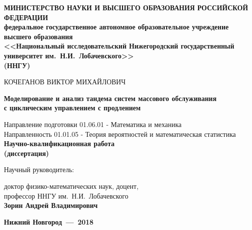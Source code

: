 \documentclass[10pt]{extarticle}
\begin{document}
\begin{titlepage}

  \begin{center}
    \textbf{МИНИСТЕРСТВО НАУКИ И ВЫСШЕГО ОБРАЗОВАНИЯ РОССИЙСКОЙ ФЕДЕРАЦИИ\\
    федеральное государственное автономное образовательное учреждение
    высшего образования\\ {\large <<Национальный исследовательский Нижегородский государственный университет им.~Н.И.~Лобачевского>>  \\(ННГУ)}}
    
    \vfill 
    
    {\Large КОЧЕГАНОВ ВИКТОР МИХАЙЛОВИЧ
    \bigskip
    \bigskip
    \bigskip

     \textbf{Моделирование и анализ тандема систем массового обслуживания\\ с циклическим управлением с продлением}
    }
    
    \bigskip
    \bigskip
    {\large Направление подготовки 	01.06.01 - Математика и механика \\
    Направленность  01.01.05 - Теория вероятностей и математическая статистика\\
    }
 \vfill 
    \textbf{\Large Научно-квалификационная работа\\
    (диссертация)}
        \vfill 
  \hfill
    \begin{minipage}[h]{ 0.5\linewidth}\large

Научный руководитель:

\medskip
 доктор физико-математических наук, доцент,\\
\indent профессор ННГУ им.~Н.И.~Лобачевского\\
\indent \textbf{Зорин Андрей Владимирович}

    \end{minipage}
 \vfill 

    \textbf{\large Нижний Новгород~---~2018}
  \end{center}
  
\end{titlepage}
\end{document}
